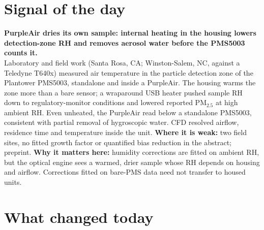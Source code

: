 \documentclass[10pt]{article}
\begin{document}
\vspace{6mm}

\section*{\sffamily\bfseries\color{Deep}Signal of the day}
\vspace{-1.5mm}{\color{Amber}\rule{\linewidth}{1.1pt}}\vspace{2.5mm}

\begin{keybox}
{\sffamily\bfseries\small\color{Deep}PurpleAir dries its own sample: internal heating in the housing lowers
detection-zone RH and removes aerosol water before the PMS5003 counts it.}\\[1.4mm]
\footnotesize
Laboratory and field work (Santa Rosa, CA; Winston-Salem, NC, against a Teledyne T640x) measured air temperature in the
particle detection zone of the Plantower PMS5003, standalone and inside a PurpleAir. The housing warms the zone more than
a bare sensor; a wraparound USB heater pushed sample RH down to regulatory-monitor conditions and lowered reported
PM$_{2.5}$ at high ambient RH. Even unheated, the PurpleAir read below a standalone PMS5003, consistent with partial
removal of hygroscopic water. CFD resolved airflow, residence time and temperature inside the unit.
\textbf{Where it is weak:} two field sites, no fitted growth factor or quantified bias reduction in the abstract;
preprint.
\textbf{Why it matters here:} humidity corrections are fitted on ambient RH, but the optical engine sees a warmed, drier
sample whose RH depends on housing and airflow. Corrections fitted on bare-PMS data need not transfer to housed units.\par
\end{keybox}

\vspace{3mm}

\section*{\sffamily\bfseries\color{Deep}What changed today}
\vspace{-1.5mm}{\color{Amber}\rule{\linewidth}{1.1pt}}\vspace{2.5mm}
\end{document}
